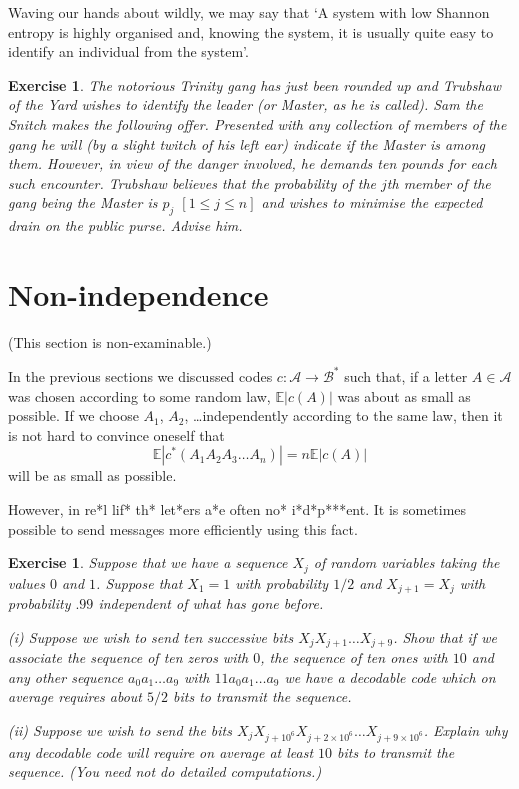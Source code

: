 \documentclass[12pt,a4paper]{article}
\theoremstyle{plain}
\newtheorem{exercise}[theorem]{Exercise}
\theoremstyle{definition}
\begin{document}
    Waving our hands about wildly, we may say that
    `A system with low Shannon entropy is highly
    organised and, knowing the system, it is
    usually quite easy to identify an individual from the
    system'.
    \begin{exercise}
        The notorious Trinity gang
        has just been rounded up and
        Trubshaw of the Yard wishes to identify the leader (or Master,
        as he is called). Sam the Snitch makes the following offer.
        Presented with any collection of members of the gang
        he will (by a slight twitch of his left ear)
        indicate if the Master is among them. However, in
        view of the danger involved, he demands ten pounds
        for each such encounter. Trubshaw believes that
        the probability of the $j$th member of the gang being
        the Master is $p_{j}$ $[1\leq j\leq n]$
        and wishes to minimise the expected drain on the public purse.
        Advise him.
    \end{exercise}
    \section{Non-independence}

    (This section is non-examinable.)

    In the previous sections we discussed codes
    $c:{\mathcal A}\rightarrow{\mathcal B}^{*}$
    such that, if a letter $A\in{\mathcal A}$ was chosen according to
    some random law, ${\mathbb E}|c(A)|$ was about
    as small as possible. If we choose $A_{1}$, $A_{2}$,
    \dots independently according to the same law,
    then it is not hard to convince oneself that
    \[{\mathbb E}|c^{*}(A_{1}A_{2}A_{3}\dots A_{n})|
    =n{\mathbb E}|c(A)|\]
    will be as small as possible.

    However, in re*l lif* th* let*ers a*e
    often no* i*d*p***ent. It is sometimes possible
    to send messages more
    efficiently using this fact.
    \begin{exercise}
        \label{E;Markov}
        Suppose that we have a sequence
        $X_{j}$ of random variables taking the values
        $0$ and $1$. Suppose that $X_{1}=1$ with probability $1/2$
        and
        $X_{j+1}=X_{j}$ with probability
        $.99$ independent of what has gone before.

        (i) Suppose we wish to send ten successive bits
        $X_{j}X_{j+1}\dots X_{j+9}$. Show that if we associate
        the sequence of ten zeros with $0$, the sequence
        of ten ones with $10$ and any other sequence
        $a_{0}a_{1}\dots a_{9}$ with $11a_{0}a_{1}\dots a_{9}$
        we have a decodable code which on average requires
        about $5/2$ bits to transmit the sequence.

        (ii) Suppose we wish to send the bits
        $X_{j}X_{j+10^{6}}X_{j+2\times 10^{6}}\dots X_{j+9\times 10^{6}}$.
        Explain why any decodable code will require
        on average at least $10$ bits to transmit the sequence.
        (You need not do detailed computations.)
    \end{exercise}
\end{document}
